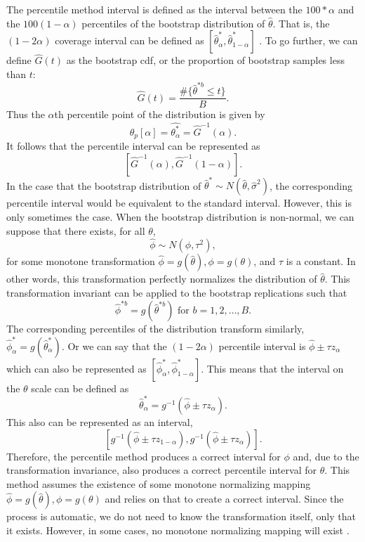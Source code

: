 \documentclass[12pt]{article}
\begin{document}
The percentile method interval is defined as the interval between the
\(100 * \alpha\) and the \(100(1 - \alpha)\) percentiles of the
bootstrap distribution of \(\hat{\theta}\). That is, the
\((1 - 2\alpha)\) coverage interval can be defined as
\([\hat{\theta}^*_\alpha,\hat{\theta}^*_{1-\alpha}]\)
\citep[\citet{EfronCasi}]{Efron86}. To go further, we can define
\(\hat{G}(t)\) as the bootstrap cdf, or the proportion of bootstrap
samples less than \(t\):
\[\hat{G}(t) = \frac{\#\{\hat{\theta}^{*b} \leq t\}}{B}.\] Thus the
\(\alpha\)th percentile point of the distribution is given by
\[\hat{\theta}_p[\alpha] = \hat{\theta^*_\alpha} = \hat{G}^{-1}(\alpha).\]
It follows that the percentile interval can be represented as
\[\left [ \hat{G}^{-1}(\alpha),\hat{G}^{-1}(1-\alpha) \right ].\] In the
case that the bootstrap distribution of
\(\hat{\theta}^* \sim N(\hat{\theta}, \hat{\sigma}^2)\), the
corresponding percentile interval would be equivalent to the standard
interval. However, this is only sometimes the case. When the bootstrap
distribution is non-normal, we can suppose that there exists, for all
\(\theta\), \[\hat{\phi} \sim N(\phi, \tau^2),\] for some monotone
transformation \(\hat{\phi} = g(\hat{\theta}), \phi = g(\theta)\), and
\(\tau\) is a constant. In other words, this transformation perfectly
normalizes the distribution of \(\hat{\theta}\). This transformation
invariant can be applied to the bootstrap replications such that
\[\hat{\phi}^{*b} = g\left( \hat{\theta}^{*b}\right ) \text{ for } b = 1,2,\dots, B.\]
The corresponding percentiles of the distribution transform similarly,
\(\hat{\phi}^*_\alpha = g \left ( \hat{\theta}^*_\alpha \right )\). Or
we can say that the \((1 - 2\alpha)\) percentile interval is
\(\hat{\phi} \pm \tau z_\alpha\) which can also be represented as
\([\hat{\phi}^*_\alpha,\hat{\phi}^*_{1-\alpha}]\). This means that the
interval on the \(\theta\) scale can be defined as
\[\hat{\theta}^*_\alpha = g^{-1}(\hat{\phi} \pm \tau z_\alpha).\] This
also can be represented as an interval,
\[\left [ g^{-1}(\hat{\phi} \pm \tau z_{1-\alpha}), g^{-1}(\hat{\phi} \pm \tau z_\alpha) \right ].\]
Therefore, the percentile method produces a correct interval for
\(\phi\) and, due to the transformation invariance, also produces a
correct percentile interval for \(\theta\). This method assumes the
existence of some monotone normalizing mapping
\(\hat{\phi} = g(\hat{\theta}), \phi = g(\theta)\) and relies on that to
create a correct interval. Since the process is automatic, we do not
need to know the transformation itself, only that it exists. However, in
some cases, no monotone normalizing mapping will exist \citep{Efron86}.
\end{document}
